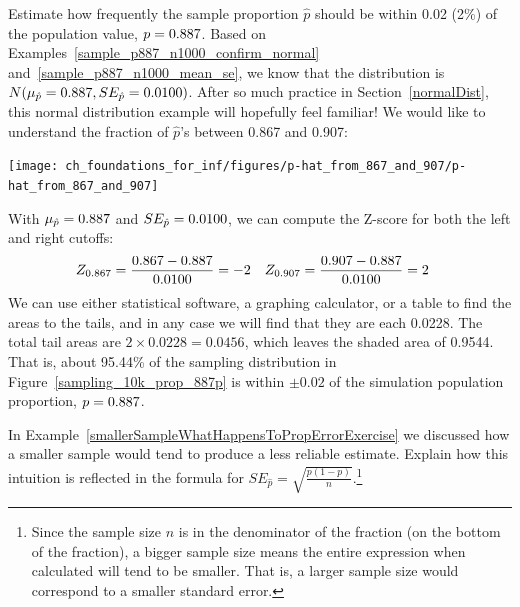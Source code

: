 \begin{example}{Estimate how frequently the sample proportion
$\hat{p}$ should be within 0.02 (2\%) of the population value,
$p = 0.887{}$. Based on
Examples~\ref{sample_p887_n1000_confirm_normal}
and~\ref{sample_p887_n1000_mean_se}, we know that the distribution is
$N(\mu_{\hat{p}} = 0.887{}, SE_{\hat{p}} = 0.0100{})$.}
\label{sampling_10k_prop_887p-prop_from_867_to_907}
After so much practice in Section~\ref{normalDist},
this normal distribution example will hopefully feel familiar!
We would like to understand the fraction of $\hat{p}$'s
between 0.867 and 0.907:
\begin{center}
\texttt{[image: ch\_foundations\_for\_inf/figures/p-hat\_from\_867\_and\_907/p-hat\_from\_867\_and\_907]}
\end{center}
With $\mu_{\hat{p}} = 0.887{}$ and
$SE_{\hat{p}} = 0.0100{}$,
we can compute the Z-score for both the left and right cutoffs:
\begin{align*}
Z_{0.867} &= \frac{0.867 - 0.887{}}{0.0100{}} = -2
&Z_{0.907} &= \frac{0.907 - 0.887{}}{0.0100{}} = 2
\end{align*}
We can use either statistical software, a graphing calculator,
or a table to find the areas to the tails, and in any case we
will find that they are each 0.0228. The total tail areas are
$2 \times 0.0228 = 0.0456$, which leaves the shaded area of
0.9544. That is, about 95.44\% of the sampling distribution
in Figure~\ref{sampling_10k_prop_887p} is within $\pm0.02$
of the simulation population proportion, $p = 0.887{}$.
\end{example}

\begin{exercise}
In Example~\ref{smallerSampleWhatHappensToPropErrorExercise}
we discussed how a smaller sample would tend
to produce a less reliable estimate. Explain how this intuition
is reflected in the formula for
$SE_{\hat{p}} = \sqrt{\frac{p (1 - p)}{n}}$.\footnote{Since the
sample size $n$ is in the denominator of the fraction (on the
bottom of the fraction), a bigger sample size means the entire
expression when calculated will tend to be smaller. That is,
a larger sample size would correspond to a smaller standard error.}
\end{exercise}

